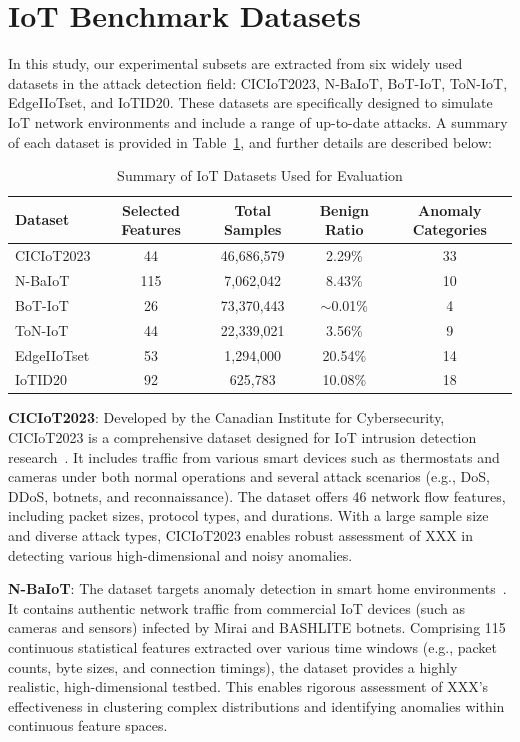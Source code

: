 \documentclass[final,twocolumn,10pt]{elsarticle}
\begin{document}
\section{IoT Benchmark Datasets}
\label{ap1:datasets}

In this study, our experimental subsets are extracted from six widely used datasets in the attack detection field: CICIoT2023, N-BaIoT, BoT-IoT, ToN-IoT, EdgeIIoTset, and IoTID20. These datasets are specifically designed to simulate IoT network environments and include a range of up-to-date attacks. A summary of each dataset is provided in Table~\ref{tab:datasets}, and further details are described below:


\begin{table}[h]
\centering
\caption{Summary of IoT Datasets Used for Evaluation}
\label{tab:datasets}
\small
\begin{tabular}{lcccc}
\toprule
\textbf{Dataset} & \textbf{Selected Features} & \textbf{Total Samples} & \textbf{Benign Ratio} & \textbf{Anomaly Categories} \\
\midrule
CICIoT2023  & 44  & 46,686,579 & 2.29\%        & 33 \\
N-BaIoT     & 115 & 7,062,042  & 8.43\%        & 10 \\
BoT-IoT     & 26  & 73,370,443 & $\sim$0.01\%  & 4  \\
ToN-IoT     & 44  & 22,339,021 & 3.56\%        & 9  \\
EdgeIIoTset & 53  & 1,294,000  & 20.54\%       & 14 \\
IoTID20     & 92  & 625,783    & 10.08\%       & 18 \\
\bottomrule
\end{tabular}
\end{table}

\textbf{CICIoT2023}: Developed by the Canadian Institute for Cybersecurity, CICIoT2023 is a comprehensive dataset designed for IoT intrusion detection research~\cite{neto2023ciciot2023}. It includes traffic from various smart devices such as thermostats and cameras under both normal operations and several attack scenarios (e.g., DoS, DDoS, botnets, and reconnaissance). The dataset offers 46 network flow features, including packet sizes, protocol types, and durations. With a large sample size and diverse attack types, CICIoT2023 enables robust assessment of XXX in detecting various high-dimensional and noisy anomalies.

\textbf{N-BaIoT}: The dataset targets anomaly detection in smart home environments~\cite{8490192}. It contains authentic network traffic from commercial IoT devices (such as cameras and sensors) infected by Mirai and BASHLITE botnets. Comprising 115 continuous statistical features extracted over various time windows (e.g., packet counts, byte sizes, and connection timings), the dataset provides a highly realistic, high-dimensional testbed. This enables rigorous assessment of XXX's effectiveness in clustering complex distributions and identifying anomalies within continuous feature spaces.
\end{document}
